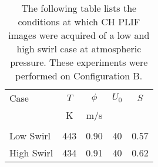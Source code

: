 \begin{table}
  \caption[Test conditions for studying swirl effects]{The following table lists the conditions at which CH PLIF images were acquired of a low and high swirl case at atmospheric pressure. These experiments were performed on Configuration B.}
  \begin{center}
    \begin{tabular}{lcccc}
      Case & \(T\) & \(\phi\) & \(U_0\) & \(S\) \tabularnewline
      & K & m/s & & \tabularnewline
      \hline\hline
      & & & & \tabularnewline
      Low Swirl & 443 & 0.90 & 40 & 0.57 \tabularnewline
      High Swirl & 434 & 0.91 & 40 & 0.62 \tabularnewline
      \hline
    \end{tabular}
  \end{center}
  \label{tab:swirlCases}
\end{table}

